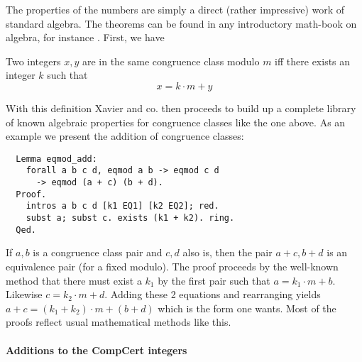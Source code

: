 The properties of the numbers are simply a direct (rather impressive)
work of standard algebra. The theorems can be found in any
introductory math-book on algebra, for instance
\cite{thorup:algebra}. First, we have
\begin{defn}
  Two integers $x, y$ are in the same congruence class modulo $m$ iff
  there exists an integer $k$ such that
  \begin{equation*}
    x = k \cdot m + y
  \end{equation*}
\end{defn}
With this definition Xavier and co. then proceeds to build up a
complete library of known algebraic properties for congruence classes
like the one above. As an example we present the addition of
congruence classes:
\begin{verbatim}
  Lemma eqmod_add:
    forall a b c d, eqmod a b -> eqmod c d
      -> eqmod (a + c) (b + d).
  Proof.
    intros a b c d [k1 EQ1] [k2 EQ2]; red.
    subst a; subst c. exists (k1 + k2). ring.
  Qed.
\end{verbatim}
If $a, b$ is a congruence class pair and $c, d$ also is, then the pair
$a+c, b+d$ is an equivalence pair (for a fixed modulo). The proof proceeds by the
well-known method that there must exist a $k_1$ by the first pair such
that $a = k_1 \cdot m + b$. Likewise $c = k_2 \cdot m + d$. Adding
these 2 equations and rearranging yields $a + c = (k_1 + k_2) \cdot m
 + (b + d)$ which is the form one wants. Most of the proofs reflect
usual mathematical methods like this.

\paragraph{Additions to the CompCert integers}


